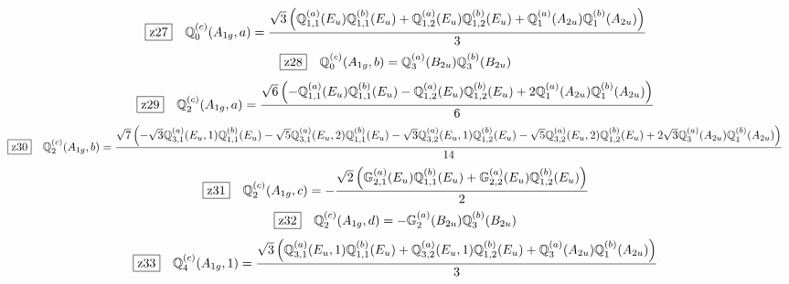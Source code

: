 \documentclass[fleqn,10pt,landscape]{jsarticle}
\begin{document}
\begin{dmath*}
\hspace*{3mm}\fbox{z27}\quad \mathbb{Q}_{0}^{(c)}(A_{1g},a)=\frac{\sqrt{3} \left(\mathbb{Q}_{1,1}^{(a)}(E_{u}) \mathbb{Q}_{1,1}^{(b)}(E_{u}) + \mathbb{Q}_{1,2}^{(a)}(E_{u}) \mathbb{Q}_{1,2}^{(b)}(E_{u}) + \mathbb{Q}_{1}^{(a)}(A_{2u}) \mathbb{Q}_{1}^{(b)}(A_{2u})\right)}{3}
\end{dmath*}
\begin{dmath*}
\hspace*{3mm}\fbox{z28}\quad \mathbb{Q}_{0}^{(c)}(A_{1g},b)=\mathbb{Q}_{3}^{(a)}(B_{2u}) \mathbb{Q}_{3}^{(b)}(B_{2u})
\end{dmath*}
\begin{dmath*}
\hspace*{3mm}\fbox{z29}\quad \mathbb{Q}_{2}^{(c)}(A_{1g},a)=\frac{\sqrt{6} \left(- \mathbb{Q}_{1,1}^{(a)}(E_{u}) \mathbb{Q}_{1,1}^{(b)}(E_{u}) - \mathbb{Q}_{1,2}^{(a)}(E_{u}) \mathbb{Q}_{1,2}^{(b)}(E_{u}) + 2 \mathbb{Q}_{1}^{(a)}(A_{2u}) \mathbb{Q}_{1}^{(b)}(A_{2u})\right)}{6}
\end{dmath*}
\begin{dmath*}
\hspace*{3mm}\fbox{z30}\quad \mathbb{Q}_{2}^{(c)}(A_{1g},b)=\frac{\sqrt{7} \left(- \sqrt{3} \mathbb{Q}_{3,1}^{(a)}(E_{u},1) \mathbb{Q}_{1,1}^{(b)}(E_{u}) - \sqrt{5} \mathbb{Q}_{3,1}^{(a)}(E_{u},2) \mathbb{Q}_{1,1}^{(b)}(E_{u}) - \sqrt{3} \mathbb{Q}_{3,2}^{(a)}(E_{u},1) \mathbb{Q}_{1,2}^{(b)}(E_{u}) - \sqrt{5} \mathbb{Q}_{3,2}^{(a)}(E_{u},2) \mathbb{Q}_{1,2}^{(b)}(E_{u}) + 2 \sqrt{3} \mathbb{Q}_{3}^{(a)}(A_{2u}) \mathbb{Q}_{1}^{(b)}(A_{2u})\right)}{14}
\end{dmath*}
\begin{dmath*}
\hspace*{3mm}\fbox{z31}\quad \mathbb{Q}_{2}^{(c)}(A_{1g},c)=- \frac{\sqrt{2} \left(\mathbb{G}_{2,1}^{(a)}(E_{u}) \mathbb{Q}_{1,1}^{(b)}(E_{u}) + \mathbb{G}_{2,2}^{(a)}(E_{u}) \mathbb{Q}_{1,2}^{(b)}(E_{u})\right)}{2}
\end{dmath*}
\begin{dmath*}
\hspace*{3mm}\fbox{z32}\quad \mathbb{Q}_{2}^{(c)}(A_{1g},d)=- \mathbb{G}_{2}^{(a)}(B_{2u}) \mathbb{Q}_{3}^{(b)}(B_{2u})
\end{dmath*}
\begin{dmath*}
\hspace*{3mm}\fbox{z33}\quad \mathbb{Q}_{4}^{(c)}(A_{1g},1)=\frac{\sqrt{3} \left(\mathbb{Q}_{3,1}^{(a)}(E_{u},1) \mathbb{Q}_{1,1}^{(b)}(E_{u}) + \mathbb{Q}_{3,2}^{(a)}(E_{u},1) \mathbb{Q}_{1,2}^{(b)}(E_{u}) + \mathbb{Q}_{3}^{(a)}(A_{2u}) \mathbb{Q}_{1}^{(b)}(A_{2u})\right)}{3}
\end{dmath*}
\end{document}
